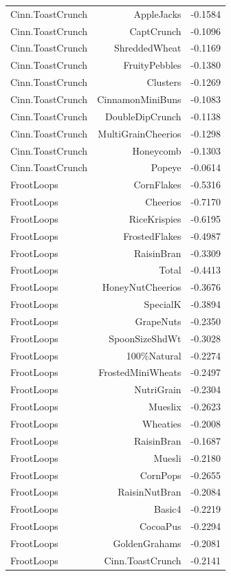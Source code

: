 \begin{longtable}{@{}lrr@{}}
Cinn.ToastCrunch & AppleJacks & -0.1584 \\
Cinn.ToastCrunch & CaptCrunch & -0.1096 \\
Cinn.ToastCrunch & ShreddedWheat & -0.1169 \\
Cinn.ToastCrunch & FruityPebbles & -0.1380 \\
Cinn.ToastCrunch & Clusters & -0.1269 \\
Cinn.ToastCrunch & CinnamonMiniBuns & -0.1083 \\
Cinn.ToastCrunch & DoubleDipCrunch & -0.1138 \\
Cinn.ToastCrunch & MultiGrainCheerios & -0.1298 \\
Cinn.ToastCrunch & Honeycomb & -0.1303 \\
Cinn.ToastCrunch & Popeye & -0.0614 \\
FrootLoops & CornFlakes & -0.5316 \\
FrootLoops & Cheerios & -0.7170 \\
FrootLoops & RiceKrispies & -0.6195 \\
FrootLoops & FrostedFlakes & -0.4987 \\
FrootLoops & RaisinBran & -0.3309 \\
FrootLoops & Total & -0.4413 \\
FrootLoops & HoneyNutCheerios & -0.3676 \\
FrootLoops & SpecialK & -0.3894 \\
FrootLoops & GrapeNuts & -0.2350 \\
FrootLoops & SpoonSizeShdWt & -0.3028 \\
FrootLoops & 100\%Natural & -0.2274 \\
FrootLoops & FrostedMiniWheats & -0.2497 \\
FrootLoops & NutriGrain & -0.2304 \\
FrootLoops & Mueslix & -0.2623 \\
FrootLoops & Wheaties & -0.2008 \\
FrootLoops & RaisinBran & -0.1687 \\
FrootLoops & Muesli & -0.2180 \\
FrootLoops & CornPops & -0.2655 \\
FrootLoops & RaisinNutBran & -0.2084 \\
FrootLoops & Basic4 & -0.2219 \\
FrootLoops & CocoaPus & -0.2294 \\
FrootLoops & GoldenGrahams & -0.2081 \\
FrootLoops & Cinn.ToastCrunch & -0.2141 \\

\end{longtable}
